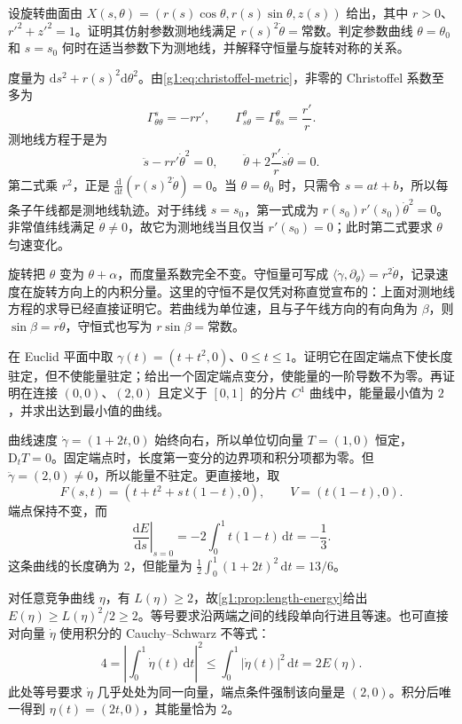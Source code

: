 \begin{exercise}
	\label{g1:ex:revolution-geodesic-integral}
	设旋转曲面由 \(X(s,\theta)=(r(s)\cos\theta,r(s)\sin\theta,z(s))\) 给出，其中 \(r>0\)、\(r'^2+z'^2=1\)。证明其仿射参数测地线满足 \(r(s)^2\dot\theta=\text{常数}\)。判定参数曲线 \(\theta=\theta_0\) 和 \(s=s_0\) 何时在适当参数下为测地线，并解释守恒量与旋转对称的关系。
\end{exercise}
\begin{solution}
	度量为 \(\mathrm{d}s^2+r(s)^2\mathrm{d}\theta^2\)。由\eqref{g1:eq:christoffel-metric}，非零的 Christoffel 系数至多为
	\[
		\Gamma^s_{\theta\theta}=-rr',\qquad
		\Gamma^\theta_{s\theta}=\Gamma^\theta_{\theta s}=\frac{r'}r.
	\]
	测地线方程于是为
	\[
		\ddot s-rr'\dot\theta^2=0,\qquad
		\ddot\theta+2\frac{r'}r\dot s\dot\theta=0.
	\]
	第二式乘 \(r^2\)，正是 \(\frac{\mathrm{d}}{\mathrm{d}t}(r(s)^2\dot\theta)=0\)。当 \(\theta=\theta_0\) 时，只需令 \(s=at+b\)，所以每条子午线都是测地线轨迹。对于纬线 \(s=s_0\)，第一式成为 \(r(s_0)r'(s_0)\dot\theta^2=0\)。非常值纬线满足 \(\dot\theta\ne0\)，故它为测地线当且仅当 \(r'(s_0)=0\)；此时第二式要求 \(\theta\) 匀速变化。

	旋转把 \(\theta\) 变为 \(\theta+\alpha\)，而度量系数完全不变。守恒量可写成 \(\langle\dot\gamma,\partial_\theta\rangle=r^2\dot\theta\)，记录速度在旋转方向上的内积分量。这里的守恒不是仅凭对称直觉宣布的：上面对测地线方程的求导已经直接证明它。若曲线为单位速，且与子午线方向的有向角为 \(\beta\)，则 \(\sin\beta=r\dot\theta\)，守恒式也写为 \(r\sin\beta=\text{常数}\)。
\end{solution}

\begin{exercise}
	\label{g1:ex:length-energy-parametrization}
	在 Euclid 平面中取 \(\gamma(t)=(t+t^2,0)\)、\(0\le t\le1\)。证明它在固定端点下使长度驻定，但不使能量驻定；给出一个固定端点变分，使能量的一阶导数不为零。再证明在连接 \((0,0)\)、\((2,0)\) 且定义于 \([0,1]\) 的分片 \(C^1\) 曲线中，能量最小值为 \(2\)，并求出达到最小值的曲线。
\end{exercise}
\begin{solution}
	曲线速度 \(\dot\gamma=(1+2t,0)\) 始终向右，所以单位切向量 \(T=(1,0)\) 恒定，\(\mathrm{D}_tT=0\)。固定端点时，长度第一变分的边界项和积分项都为零。但 \(\ddot\gamma=(2,0)\ne0\)，所以能量不驻定。更直接地，取
	\[
		F(s,t)=(t+t^2+s\,t(1-t),0),\qquad V=(t(1-t),0).
	\]
	端点保持不变，而
	\[
		\left.\frac{\mathrm{d}E}{\mathrm{d}s}\right|_{s=0}
		=-2\int_0^1t(1-t)\,\mathrm{d}t=-\frac13.
	\]
	这条曲线的长度确为 \(2\)，但能量为 \(\frac12\int_0^1(1+2t)^2\,\mathrm{d}t=13/6\)。

	对任意竞争曲线 \(\eta\)，有 \(L(\eta)\ge2\)，故\cref{g1:prop:length-energy}给出 \(E(\eta)\ge L(\eta)^2/2\ge2\)。等号要求沿两端之间的线段单向行进且等速。也可直接对向量 \(\dot\eta\) 使用积分的 Cauchy--Schwarz 不等式：
	\[
		4=\left|\int_0^1\dot\eta(t)\,\mathrm{d}t\right|^2
		\le\int_0^1|\dot\eta(t)|^2\,\mathrm{d}t=2E(\eta).
	\]
	此处等号要求 \(\dot\eta\) 几乎处处为同一向量，端点条件强制该向量是 \((2,0)\)。积分后唯一得到 \(\eta(t)=(2t,0)\)，其能量恰为 \(2\)。
\end{solution}

